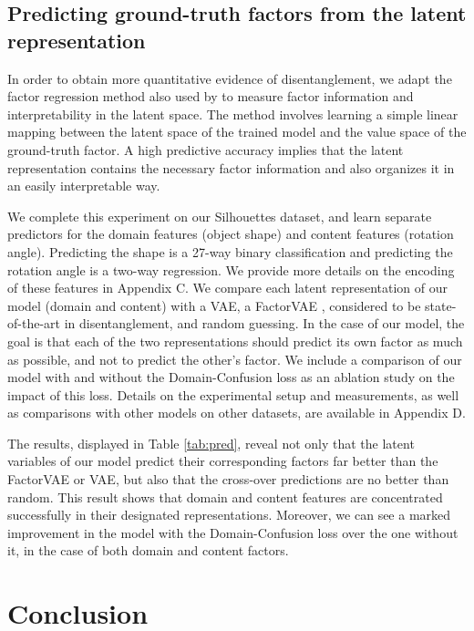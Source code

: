 \documentclass{article} %
\begin{document}
\subsection{Predicting ground-truth factors from the latent representation}

In order to obtain more quantitative evidence of disentanglement, we adapt the factor regression method also used by \citet{greff2019multi} to measure factor information and interpretability in the latent space. The method involves learning a simple linear mapping between the latent space of the trained model and the value space of the ground-truth factor. A high predictive accuracy implies that the latent representation contains the necessary factor information and also organizes it in an easily interpretable way.

We complete this experiment on our Silhouettes dataset, and learn separate predictors for the domain features (object shape) and content features (rotation angle). Predicting the shape is a 27-way binary classification and predicting the rotation angle is a two-way regression. We provide more details on the encoding of these features in Appendix C. We compare each latent representation of our model (domain and content) with a VAE, a FactorVAE \citep{kim2018disentangling}, considered to be state-of-the-art in disentanglement, and random guessing. In the case of our model, the goal is that each of the two representations should predict its own factor as much as possible, and not to predict the other's factor. We include a comparison of our model with and without the Domain-Confusion loss as an ablation study on the impact of this loss. Details on the experimental setup and measurements, as well as comparisons with other models on other datasets, are available in Appendix D.


The results, displayed in Table \ref{tab:pred}, reveal not only that the latent variables of our model predict their corresponding factors far better than the FactorVAE or VAE, but also that the cross-over predictions are no better than random. This result shows that domain and content features are concentrated successfully in their designated representations. Moreover, we can see a marked improvement in the model with the Domain-Confusion loss over the one without it, in the case of both domain and content factors.

\section{Conclusion}
\end{document}
